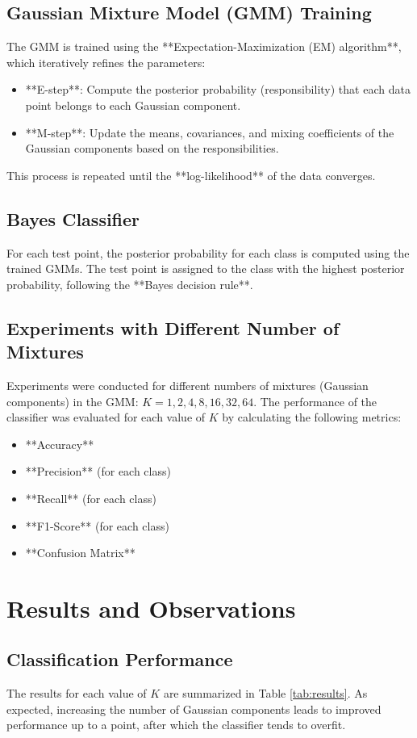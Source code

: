 \documentclass[conference]{IEEEtran}
\begin{document}
	\subsection{Gaussian Mixture Model (GMM) Training}
	The GMM is trained using the **Expectation-Maximization (EM) algorithm**, which iteratively refines the parameters:
	\begin{itemize}
		\item **E-step**: Compute the posterior probability (responsibility) that each data point belongs to each Gaussian component.
		\item **M-step**: Update the means, covariances, and mixing coefficients of the Gaussian components based on the responsibilities.
	\end{itemize}
	This process is repeated until the **log-likelihood** of the data converges.
	
	\subsection{Bayes Classifier}
	For each test point, the posterior probability for each class is computed using the trained GMMs. The test point is assigned to the class with the highest posterior probability, following the **Bayes decision rule**.
	
	\subsection{Experiments with Different Number of Mixtures}
	Experiments were conducted for different numbers of mixtures (Gaussian components) in the GMM: \(K = 1, 2, 4, 8, 16, 32, 64\). The performance of the classifier was evaluated for each value of \(K\) by calculating the following metrics:
	\begin{itemize}
		\item **Accuracy**
		\item **Precision** (for each class)
		\item **Recall** (for each class)
		\item **F1-Score** (for each class)
		\item **Confusion Matrix**
	\end{itemize}
	
	\section{Results and Observations}
	
	\subsection{Classification Performance}
	The results for each value of \(K\) are summarized in Table \ref{tab:results}. As expected, increasing the number of Gaussian components leads to improved performance up to a point, after which the classifier tends to overfit.
	
\end{document}
